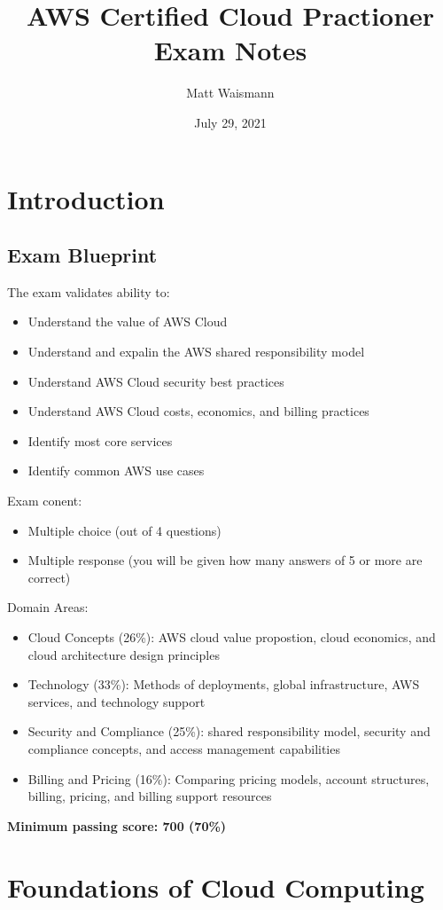 \documentclass{article}%
\title{AWS Certified Cloud Practioner Exam Notes}
\date{July 29, 2021}
\author{Matt Waismann}
\begin{document}
\maketitle
\section{Introduction}
\subsection{Exam Blueprint}
The exam validates ability to:
\begin{itemize}
    \item Understand the value of AWS Cloud
    \item Understand and expalin the AWS shared responsibility model
    \item Understand AWS Cloud security best practices
    \item Understand AWS Cloud costs, economics, and billing practices
    \item Identify most core services
    \item Identify common AWS use cases
\end{itemize}
Exam conent:
\begin{itemize}
    \item Multiple choice (out of 4 questions)
    \item Multiple response (you will be given how many answers of 5 or more are correct)
\end{itemize}
Domain Areas:
\begin{itemize}
    \item Cloud Concepts (26\%): AWS cloud value propostion, cloud economics, and cloud architecture design principles
    \item Technology (33\%): Methods of deployments, global infrastructure, AWS services, and technology support
    \item Security and Compliance (25\%): shared responsibility model, security and compliance concepts, and access management capabilities
    \item Billing and Pricing (16\%): Comparing pricing models, account structures, billing, pricing, and billing support resources
\end{itemize}
\textbf{Minimum passing score: 700 (70\%)}

\section{Foundations of Cloud Computing}
\end{document}
